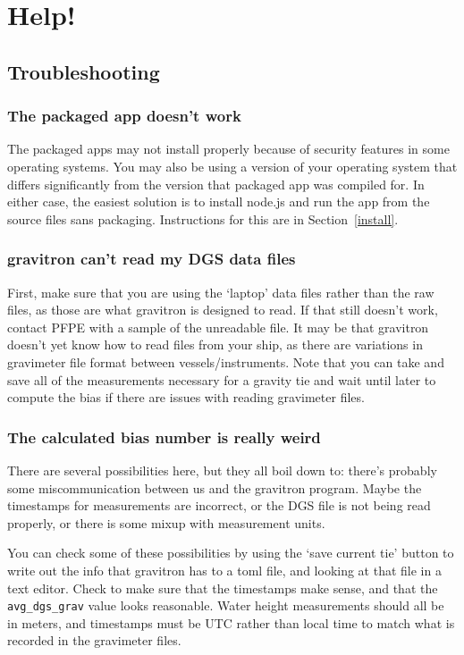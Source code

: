 \documentclass{pfpe-manual}
\begin{document}
\section{Help!}
\label{helphelp}

\subsection{Troubleshooting}

\subsubsection{The packaged app doesn't work}
The packaged apps may not install properly because of security features in some operating systems. You may also be using a version of your operating system that differs significantly from the version that packaged app was compiled for. In either case, the easiest solution is to install node.js and run the app from the source files sans packaging. Instructions for this are in Section~\ref{install}.

\subsubsection{gravitron can't read my DGS data files}
First, make sure that you are using the `laptop' data files rather than the raw files, as those are what gravitron is designed to read. If that still doesn't work, contact PFPE with a sample of the unreadable file. It may be that gravitron doesn't yet know how to read files from your ship, as there are variations in gravimeter file format between vessels/instruments. Note that you can take and save all of the measurements necessary for a gravity tie and wait until later to compute the bias if there are issues with reading gravimeter files.

\subsubsection{The calculated bias number is really weird}
There are several possibilities here, but they all boil down to: there's probably some miscommunication between us and the gravitron program. Maybe the timestamps for measurements are incorrect, or the DGS file is not being read properly, or there is some mixup with measurement units. 

You can check some of these possibilities by using the `save current tie' button to write out the info that gravitron has to a toml file, and looking at that file in a text editor. Check to make sure that the timestamps make sense, and that the \texttt{avg\_dgs\_grav} value looks reasonable. Water height measurements should all be in meters, and timestamps must be UTC rather than local time to match what is recorded in the gravimeter files.
\end{document}
